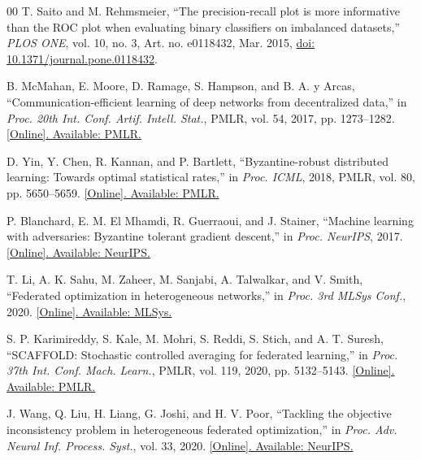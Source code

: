 \documentclass{ieeeaccess}
\begin{document}
\clearpage
\begin{thebibliography}{00}
T. Saito and M. Rehmsmeier, ``The precision-recall plot is more informative
than the ROC plot when evaluating binary classifiers on imbalanced datasets,''
\emph{PLOS ONE}, vol. 10, no. 3, Art. no. e0118432, Mar. 2015,
\href{https://doi.org/10.1371/journal.pone.0118432}
{doi: 10.1371/journal.pone.0118432}.

B. McMahan, E. Moore, D. Ramage, S. Hampson, and B. A. y Arcas,
``Communication-efficient learning of deep networks from decentralized
data,'' in \emph{Proc. 20th Int. Conf. Artif. Intell. Stat.}, PMLR, vol. 54,
2017, pp. 1273--1282.
\href{https://proceedings.mlr.press/v54/mcmahan17a.html}
{[Online]. Available: PMLR.}

D. Yin, Y. Chen, R. Kannan, and P. Bartlett, ``Byzantine-robust distributed
learning: Towards optimal statistical rates,'' in \emph{Proc. ICML}, 2018,
PMLR, vol. 80, pp. 5650--5659.
\href{https://proceedings.mlr.press/v80/yin18a.html}
{[Online]. Available: PMLR.}

P. Blanchard, E. M. El Mhamdi, R. Guerraoui, and J. Stainer,
``Machine learning with adversaries: Byzantine tolerant gradient descent,''
in \emph{Proc. NeurIPS}, 2017.
\href{https://proceedings.neurips.cc/paper/2017/hash/f4b9ec30ad9f68f89b29639786cb62ef-Abstract.html}
{[Online]. Available: NeurIPS.}

T. Li, A. K. Sahu, M. Zaheer, M. Sanjabi, A. Talwalkar, and V. Smith,
``Federated optimization in heterogeneous networks,'' in
\emph{Proc. 3rd MLSys Conf.}, 2020.
\href{https://proceedings.mlsys.org/paper_files/paper/2020/hash/1f5fe83998a09396ebe6477d9475ba0c-Abstract.html}
{[Online]. Available: MLSys.}

S. P. Karimireddy, S. Kale, M. Mohri, S. Reddi, S. Stich, and A. T. Suresh,
``SCAFFOLD: Stochastic controlled averaging for federated learning,'' in
\emph{Proc. 37th Int. Conf. Mach. Learn.}, PMLR, vol. 119, 2020,
pp. 5132--5143.
\href{https://proceedings.mlr.press/v119/karimireddy20a.html}
{[Online]. Available: PMLR.}

J. Wang, Q. Liu, H. Liang, G. Joshi, and H. V. Poor, ``Tackling the
objective inconsistency problem in heterogeneous federated optimization,''
in \emph{Proc. Adv. Neural Inf. Process. Syst.}, vol. 33, 2020.
\href{https://proceedings.neurips.cc/paper/2020/hash/564127c03caab942e503ee6f810f54fd-Abstract.html}
{[Online]. Available: NeurIPS.}


\end{thebibliography}
\end{document}
